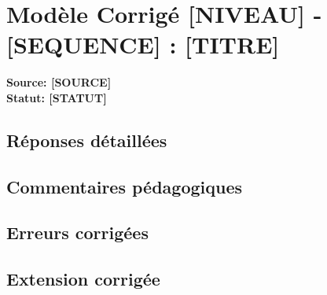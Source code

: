 \documentclass[a4paper,11pt]{article}
\begin{document}
\section*{Modèle Corrigé [NIVEAU] - [SEQUENCE] : [TITRE]}
\textbf{Source: [SOURCE]}\\
\textbf{Statut: [STATUT]}

\subsection*{Réponses détaillées}

\subsection*{Commentaires pédagogiques}

\subsection*{Erreurs corrigées}

\subsection*{Extension corrigée}
\end{document}
